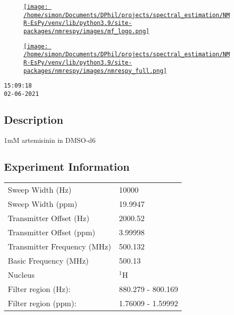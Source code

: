 \documentclass[8pt]{article}
\begin{document}
\begin{figure}[!ht]
\begin{minipage}[b][2.5cm][c]{.72\textwidth}
\href{http://foroozandeh.chem.ox.ac.uk/home}%
{\texttt{[image: /home/simon/Documents/DPhil/projects/spectral\_estimation/NMR-EsPy/venv/lib/python3.9/site-packages/nmrespy/images/mf\_logo.png]}}
\end{minipage}
\begin{minipage}[b][2.5cm][c]{.27\textwidth}
\href{https://foroozandehgroup.github.io/NMR-EsPy}%
{\texttt{[image: /home/simon/Documents/DPhil/projects/spectral\_estimation/NMR-EsPy/venv/lib/python3.9/site-packages/nmrespy/images/nmrespy\_full.png]}}
\end{minipage}
\end{figure}

\texttt{15:09:18\\02-06-2021}

\subsection*{Description}
1mM artemisinin in DMSO-d6

\subsection*{Experiment Information}
\hspace{-6pt}
\begin{tabular}{ll}
Sweep Width (Hz) & 10000 \\
Sweep Width (ppm) & 19.9947 \\
Transmitter Offset (Hz) & 2000.52 \\
Transmitter Offset (ppm) & 3.99998 \\
Transmitter Frequency (MHz) & 500.132 \\
Basic Frequency (MHz) & 500.13 \\
Nucleus & $^{1}$H \\
Filter region (Hz): & 880.279 - 800.169 \\
Filter region (ppm): & 1.76009 - 1.59992 \\

\end{tabular}
\end{document}
